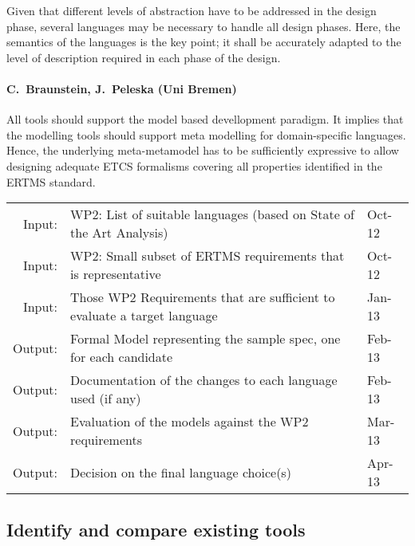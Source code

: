 \documentclass[11pt, a4paper]{article}
\let\oldmarginpar\marginpar
\renewcommand\marginpar[1]{\-\oldmarginpar[\raggedleft\scriptsize #1]%
{\raggedright\scriptsize #1}}
\newenvironment{inoutput}
{\vspace{2mm}
\noindent
\begin{tabular}{|r|p{.7\linewidth}|l|}
\hline}
{
\hline
\end{tabular}}
\begin{document}


Given that different levels of abstraction have to be addressed in the
design phase, several languages may be necessary to handle all design
phases. Here, the semantics of the languages is the key point; it
shall be accurately adapted to the level of description required in
each phase of the design.

\paragraph{C.~Braunstein, J.~Peleska (Uni Bremen)}
All tools should support the model based devellopment paradigm.
It implies that the modelling tools should support meta modelling for domain-specific languages.
Hence, the underlying meta-metamodel has to be sufficiently expressive to allow
designing adequate ETCS formalisms covering all properties identified in the
ERTMS standard.\\

\begin{inoutput}
Input: & WP2: List of suitable languages (based on State of the Art Analysis) & Oct-12 \\
Input: & WP2: Small subset of ERTMS requirements that is representative & Oct-12 \\
Input: & Those WP2 Requirements that are sufficient to evaluate a target language & Jan-13 \\
\hline
Output: & Formal Model representing the sample spec, one for each candidate & Feb-13 \\
Output: & Documentation of the changes to each language used (if any) & Feb-13 \\
Output: & Evaluation of the models against the WP2 requirements & Mar-13 \\
Output: & Decision on the final language choice(s) & Apr-13 \\
\end{inoutput}

\subsection{Identify and compare existing tools}
\label{sec:tool}
\end{document}
